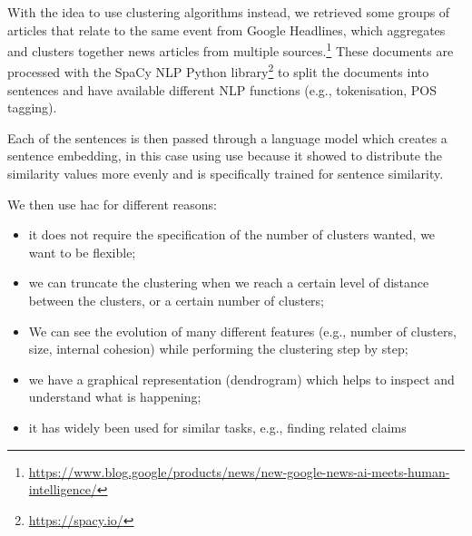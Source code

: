 With the idea to use clustering algorithms instead, we retrieved some groups of articles that relate to the same event from Google Headlines, which aggregates and clusters together news articles from multiple sources.\footnote{\url{https://www.blog.google/products/news/new-google-news-ai-meets-human-intelligence/}}
These documents are processed with the SpaCy NLP Python library\footnote{\url{https://spacy.io/}} to split the documents into sentences and have available different NLP functions (e.g., tokenisation, POS tagging).

Each of the sentences is then passed through a language model which creates a sentence embedding, in this case using \acrshort{use} because it showed to distribute the similarity values more evenly and is specifically trained for sentence similarity.

We then use \acrfull{hac} for different reasons:
\begin{itemize}
    \item it does not require the specification of the number of clusters wanted, we want to be flexible;
    \item we can truncate the clustering when we reach a certain level of distance between the clusters, or a certain number of clusters;
    \item We can see the evolution of many different features (e.g., number of clusters, size, internal cohesion) while performing the clustering step by step;
    \item we have a graphical representation (dendrogram) which helps to inspect and understand what is happening;
    \item it has widely been used for similar tasks, e.g., finding related claims~\citep{almeida2020text}
\end{itemize}


